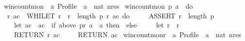 \begin{isabellebody}
\isanewline
{}\isamarkupfalse%
\ win{\isacharunderscore}{\kern0pt}count{\isacharunderscore}{\kern0pt}mon\ {\isacharcolon}{\kern0pt}{\isacharcolon}{\kern0pt}\ {\isachardoublequoteopen}{\isacharprime}{\kern0pt}a\ Profile\ {\isasymRightarrow}\ {\isacharprime}{\kern0pt}a\ {\isasymRightarrow}\ nat\ nres{\isachardoublequoteclose}\ \isanewline
{\isachardoublequoteopen}win{\isacharunderscore}{\kern0pt}count{\isacharunderscore}{\kern0pt}mon\ p\ a\ {\isasymequiv}\ do\ {\isacharbraceleft}{\kern0pt}\isanewline
\ \ {\isacharparenleft}{\kern0pt}r{\isacharcomma}{\kern0pt}\ ac{\isacharparenright}{\kern0pt}\ {\isasymleftarrow}\ WHILET\ {\isacharparenleft}{\kern0pt}{\isasymlambda}{\isacharparenleft}{\kern0pt}r{\isacharcomma}{\kern0pt}\ {\isacharunderscore}{\kern0pt}{\isacharparenright}{\kern0pt}{\isachardot}{\kern0pt}\ r\ {\isacharless}{\kern0pt}\ length\ p{\isacharparenright}{\kern0pt}\ {\isacharparenleft}{\kern0pt}{\isasymlambda}{\isacharparenleft}{\kern0pt}r{\isacharcomma}{\kern0pt}\ ac{\isacharparenright}{\kern0pt}{\isachardot}{\kern0pt}\ do\ {\isacharbraceleft}{\kern0pt}\isanewline
\ \ \ \ ASSERT\ {\isacharparenleft}{\kern0pt}r\ {\isacharless}{\kern0pt}\ length\ p{\isacharparenright}{\kern0pt}{\isacharsemicolon}{\kern0pt}\isanewline
\ \ \ \ let\ ac\ {\isacharequal}{\kern0pt}\ ac\ {\isacharplus}{\kern0pt}\ {\isacharparenleft}{\kern0pt}if\ {\isacharparenleft}{\kern0pt}above\ {\isacharparenleft}{\kern0pt}p{\isacharbang}{\kern0pt}r{\isacharparenright}{\kern0pt}\ a\ {\isacharequal}{\kern0pt}\ {\isacharbraceleft}{\kern0pt}a{\isacharbraceright}{\kern0pt}{\isacharparenright}{\kern0pt}\ then\ {}\ else\ {}{\isacharparenright}{\kern0pt}{\isacharsemicolon}{\kern0pt}\isanewline
\ \ \ \ let\ r\ {\isacharequal}{\kern0pt}\ r\ {\isacharplus}{\kern0pt}\ {}{\isacharsemicolon}{\kern0pt}\isanewline
\ \ \ \ RETURN\ {\isacharparenleft}{\kern0pt}r{\isacharcomma}{\kern0pt}\ ac{\isacharparenright}{\kern0pt}\isanewline
\ \ {\isacharbraceright}{\kern0pt}{\isacharparenright}{\kern0pt}{\isacharparenleft}{\kern0pt}{}{\isacharcomma}{\kern0pt}{}{\isacharparenright}{\kern0pt}{\isacharsemicolon}{\kern0pt}\isanewline
\ \ RETURN\ ac\isanewline
{\isacharbraceright}{\kern0pt}{\isachardoublequoteclose}\isanewline
\isanewline
\isanewline
{}\isamarkupfalse%
\ win{\isacharunderscore}{\kern0pt}count{\isacharunderscore}{\kern0pt}mon{\isacharunderscore}{\kern0pt}r\ {\isacharcolon}{\kern0pt}{\isacharcolon}{\kern0pt}\ {\isachardoublequoteopen}{\isacharprime}{\kern0pt}a\ Profile\ {\isasymRightarrow}\ {\isacharprime}{\kern0pt}a\ {\isasymRightarrow}\ nat\ nres{\isachardoublequoteclose}\ \isanewline

\end{isabellebody}
